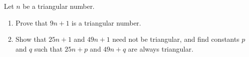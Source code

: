 Let $n$ be a triangular number.
\begin{enumerate}
\item[(a)] Prove that $9n+1$ is a triangular number.
\item[(b)] Show that $25n+1$ and $49n+1$ need not be triangular, and find constants $p$ and $q$ such that $25n+p$ and $49n+q$ are always triangular.
\end{enumerate}
